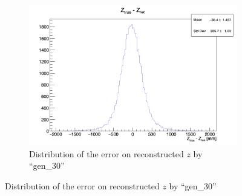 \documentclass[../main.tex]{subfiles}
\begin{document}
\begin{figure}[ht]
\begin{subfigure}[t]{0.32\linewidth}
    \includegraphics[width=\linewidth]{images/jcnn/vic_cnn/cnn_delta_z.png}
    \caption{Distribution of the error on reconstructed $z$ by ``gen\_30''}
    \label{fig:jcnn:vic_cnn:cnn_delta_z}
  \end{subfigure}



\end{figure}
\end{document}
